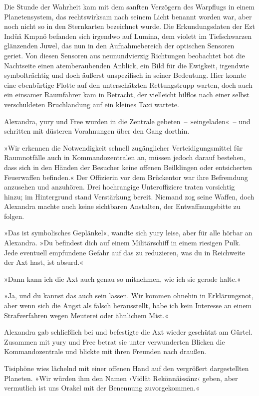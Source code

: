 Die Stunde der Wahrheit kam mit dem sanften Verzögern des Warpflugs in einem Planetensystem, das rechtswirksam nach seinem Licht benannt worden war, aber noch nicht so in den Sternkarten bezeichnet wurde. Die Erkundungsdaten der Ezt Indüä Kmpnö befanden sich irgendwo auf Lumina, dem violett im Tiefschwarzen glänzenden Juwel, das nun in den Aufnahmebereich der optischen Sensoren geriet. Von diesen Sensoren aus neunundvierzig Richtungen beobachtet bot die Nachtseite einen atemberaubenden Anblick, ein Bild für die Ewigkeit, irgendwie symbolträchtig und doch äußerst unspezifisch in seiner Bedeutung. Hier konnte eine ebenbürtige Flotte auf den unterschätzten Rettungstrupp warten, doch auch ein einsamer Raumfahrer kam in Betracht, der vielleicht hilflos nach einer selbst verschuldeten Bruchlandung auf ein kleines Taxi wartete.

Alexandra, yury und Free wurden in die Zentrale gebeten~– »eingeladen«~– und schritten mit düsteren Vorahnungen über den Gang dorthin.

»Wir erkennen die Notwendigkeit schnell zugänglicher Verteidigungsmittel für Raumnotfälle auch in Kommandozentralen an, müssen jedoch darauf bestehen, dass sich in den Händen der Besucher keine offenen Beilklingen oder entsicherten Feuerwaffen befinden.« Der Offizierin vor dem Brückentor war ihre Befremdung anzusehen und anzuhören. Drei hochrangige Unteroffiziere traten vorsichtig hinzu; im Hintergrund stand Verstärkung bereit. Niemand zog seine Waffen, doch Alexandra machte auch keine sichtbaren Anstalten, der Entwaffnungsbitte zu folgen.

»Das ist symbolisches Geplänkel«, wandte sich yury leise, aber für alle hörbar an Alexandra. »Du befindest dich auf einem Militärschiff in einem riesigen Pulk. Jede eventuell empfundene Gefahr auf das zu reduzieren, was du in Reichweite der Axt hast, ist absurd.«

»Dann kann ich die Axt auch genau so mitnehmen, wie ich sie gerade halte.«

»Ja, und du kannst das auch sein lassen. Wir kommen ohnehin in Erklärungsnot, aber wenn sich die Angst als falsch herausstellt, habe ich kein Interesse an einem Strafverfahren wegen Meuterei oder ähnlichem Mist.«

Alexandra gab schließlich bei und befestigte die Axt wieder geschützt am Gürtel. Zusammen mit yury und Free betrat sie unter verwunderten Blicken die Kommandozentrale und blickte mit ihren Freunden nach draußen.

Tisiphöne wies lächelnd mit einer offenen Hand auf den vergrößert dargestellten Planeten. »Wir würden ihm den Namen ›Viölät Rekönnäissänz‹ geben, aber vermutlich ist uns Orakel mit der Benennung zuvorgekommen.«

